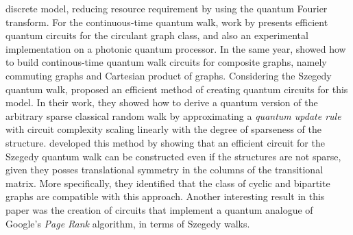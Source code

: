 \documentclass[../../dissertation.tex]{subfiles}
\begin{document}
discrete model, reducing resource requirement by using the quantum Fourier
transform. 
For the continuous-time quantum walk, work by \cite{qiang2016} presents
efficient quantum circuits for the circulant graph class, and also an
experimental implementation on a photonic quantum processor. In the same year,
\cite{loke2017b} showed how to build continous-time quantum walk circuits for
composite graphs, namely commuting graphs and Cartesian product of graphs.
Considering the Szegedy quantum walk, \cite{chiang2009} proposed an efficient
method of creating quantum circuits for this model.  In their work, they showed
how to derive a quantum version of the arbitrary sparse classical random walk
by approximating a \textit{quantum update rule} with circuit complexity scaling
linearly with the degree of sparseness of the structure. \cite{loke2017a}
developed this method by showing that an efficient circuit for the Szegedy
quantum walk can be constructed even if the structures are not sparse, given
they posses translational symmetry in the columns of the transitional matrix.
More specifically, they identified that the class of cyclic and bipartite
graphs are compatible with this approach.  Another interesting result in this
paper was the creation of circuits that implement a quantum analogue of
Google's \textit{Page Rank} algorithm, in terms of Szegedy walks.
\end{document}
